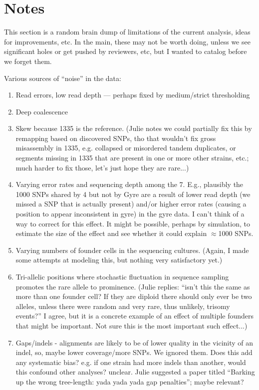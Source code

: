 \documentclass{article}\usepackage[]{graphicx}\usepackage[]{color}
\begin{document}
\section{Notes}

This section is a random brain dump of limitations of the current analysis, ideas for improvements, etc.  In the main,
these may not be worth doing, unless we see significant holes or get pushed by reviewers, etc, but I wanted to catalog
before we forget them.

 Various sources of ``noise'' in the data:
\begin{enumerate}
  \item Read errors, low read depth  --- perhaps fixed by medium/strict thresholding
  \item Deep coalescence
  \item Skew because 1335 is the reference.  (Julie notes we could partially fix this by remapping based on discovered
    SNPs, tho that wouldn't fix gross misassembly in 1335, e.g. collapsed or misordered tandem duplicates, or segments
    missing in 1335 that are present in one or more other strains, etc.; much harder to fix those, let's just hope they
    are rare...)
  \item Varying error rates and sequencing depth among the 7.  E.g., plausibly the 1000 SNPs shared by 4 but not by Gyre
    are a result of lower read depth (we missed a SNP that is actually present) and/or higher error rates (causing a
    position to appear inconsistent in gyre) in the gyre data.  I can't think of a way to correct for this effect.  It
    might be possible, perhaps by simulation, to estimate the size of the effect and see whether it could explain
    $\approx$1000 SNPs.
  \item Varying numbers of founder cells in the sequencing cultures.  (Again, I made some attempts at modeling this, but
    nothing very satisfactory yet.)
  \item Tri-allelic positions where stochastic fluctuation in sequence sampling promotes the rare allele to prominence.
    (Julie replies: ``isn't this the same as more than one founder cell? If they are diploid there should only ever be
    two alleles, unless there were random and very rare, thus unlikely, trisomy events?''  I agree, but it is a concrete
    example of an effect of multiple founders that might be important.  Not sure this is the most important such
    effect...)
  \item Gaps/indels - alignments are likely to be of lower quality in the vicinity of an indel, so, maybe lower
    coverage/more SNPs.  We ignored them.  Does this add any systematic bias?  e.g. if one strain had more indels than
    another, would this confound other analyses?  unclear.  Julie suggested a paper titled ``Barking up the wrong
    tree-length: yada yada yada gap penalties''; maybe relevant?
\end{enumerate}
\end{document}
